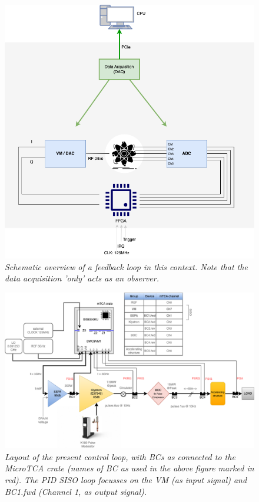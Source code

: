 \documentclass[12pt]{amsart}
\begin{document}
\begin{figure}[htbp] %
   \centering
   \includegraphics[width=5in]{im/loop2023.png} 
   \caption{\em Schematic overview of a feedback loop in this context.
   	Note that the data acquisition 'only' acts as an observer.}
   \label{fig:loop2023}
\end{figure}



\begin{figure}[htbp] %
   \centering
   \includegraphics[width=5in]{im/loop1.png} 
   \caption{\em 
   	Layout of the present control loop, with BCs as connected to the MicroTCA crate (names of BC as used in the above figure marked in red).
	The PID SISO loop focusses on the VM (as input signal) and BC1.fwd (Channel 1, as output signal).}
   \label{fig:loop1}
\end{figure}
\end{document}
